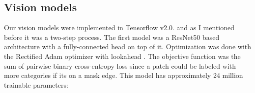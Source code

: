 \documentclass[a4paper,12pt]{article}
\begin{document}
\subsection{Vision models}

\vspace{7mm}

\par Our vision models were implemented in Tensorflow v2.0. and as I mentioned before it was a two-step process. The first model was a ResNet50 based architecture \cite{he2016deep} with a fully-connected head on top of it. Optimization was done with the Rectified Adam optimizer \cite{liu2019variance} with lookahead \cite{zhang2019lookahead}. The objective function was the sum of pairwise binary cross-entropy loss since a patch could be labeled with more categories if its on a mask edge. This model has approximately 24 million trainable parameters: 

\vspace{4mm}
\end{document}
